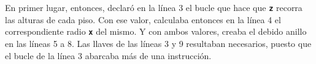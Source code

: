   En primer lugar, entonces, declaró en la línea 3 el bucle que hace
  que \textbf{\texttt{z}} recorra las alturas de cada piso. Con ese
  valor, calculaba entonces en la línea 4 el correspondiente radio
  \texttt{\textbf{x}} del mismo. Y con ambos valores, creaba el debido
  anillo en las líneas 5 a 8. Las llaves de las líneas 3 y 9
  resultaban necesarios, puesto que el bucle de la línea 3 abarcaba
  más de una instrucción.


  
